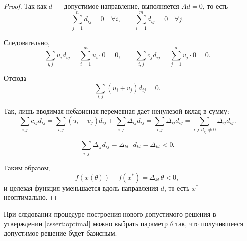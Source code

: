 \documentclass[12pt]{article}
\theoremstyle{definition}
\theoremstyle{plain}
\theoremstyle{definition}
\begin{document}
\begin{proof}
Так как $d$ --- допустимое направление, выполняется $A d = 0$, то есть
\[
\sum_{j=1}^n d_{ij} = 0 \quad \forall i, \qquad \sum_{i=1}^m d_{ij} = 0 \quad \forall j.
\]

Следовательно,
\[
\sum_{i,j} u_i d_{ij} = \sum_{i=1}^m u_i \cdot 0 = 0, \qquad
\sum_{i,j} v_j d_{ij} = \sum_{j=1}^n v_j \cdot 0 = 0.
\]

Отсюда
\[
\sum_{i,j} (u_i + v_j) d_{ij} = 0.
\]

Так, лишь вводимая небазисная переменная дает ненулевой вклад в сумму:
\[
\sum_{i,j} c_{ij} d_{ij} 
= \sum_{i,j} (u_i + v_j) d_{ij} + \sum_{i,j} \Delta_{ij} d_{ij}
= \sum_{i,j} \Delta_{ij} d_{ij}
= \sum_{i,j: d_{ij} \neq 0} \Delta_{ij} d_{ij}.
\]

\[
\sum_{i,j} \Delta_{ij} d_{ij} = \Delta_{kl} \cdot d_{kl} = \Delta_{kl} < 0.
\]

Таким образом,
\[
f(x(\theta)) - f(x^*) = \Delta_{kl} \, \theta < 0,
\]
и целевая функция уменьшается вдоль направления $d$, то есть $x^*$ неоптимально.
\end{proof}


\begin{corollarylocal}
При следовании процедуре построения нового допустимого решения
в утверждении \ref{assert:optimal} можно выбрать параметр $\theta$ так,
что получившееся допустимое решение будет базисным.
\end{corollarylocal}
\end{document}

